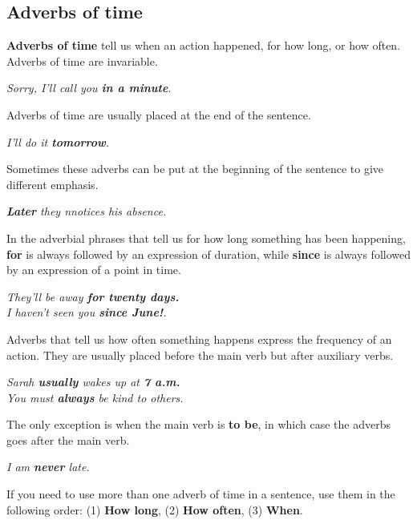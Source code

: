 \documentclass[hidelinks,10pt,a4paper]{article}
\begin{document}
\subsection{Adverbs of time}
\textbf{Adverbs of time} tell us when an action happened, for how long, or how often.
Adverbs of time are invariable.

\begin{center}
	\textit{Sorry, I'll call you \textbf{in a minute}.}
\end{center}

Adverbs of time are usually placed at the end of the sentence.

\begin{center}
	\textit{I'll do it \textbf{tomorrow}.}
\end{center}

Sometimes these adverbs can be put at the beginning of the sentence to give different emphasis.

\begin{center}
	\textit{\textbf{Later} they nnotices his absence.}
\end{center}

In the adverbial phrases that tell us for how long something has been happening, \textbf{for} is always followed by an expression of duration, while \textbf{since} is always followed by an expression of a point in time.

\begin{center}
	\textit{They'll be away \textbf{for twenty days.}}\\
	\textit{I haven't seen you \textbf{since June!}.}
\end{center}

Adverbs that tell us how often something happens express the frequency of an action. They are usually placed before the main verb but after auxiliary verbs.

\begin{center}
	\textit{Sarah \textbf{usually} wakes up at \textbf{7 a.m.}\\
	You must \textbf{always} be kind to others.}
\end{center}

The only exception is when the main verb is \textbf{to be}, in which case the adverbs goes after the main verb.

\begin{center}
	\textit{I am \textbf{never} late.}
\end{center}

If you need to use more than one adverb of time in a sentence, use them in the following order: (1) \textbf{How long}, (2) \textbf{How often}, (3) \textbf{When}.
\end{document}
